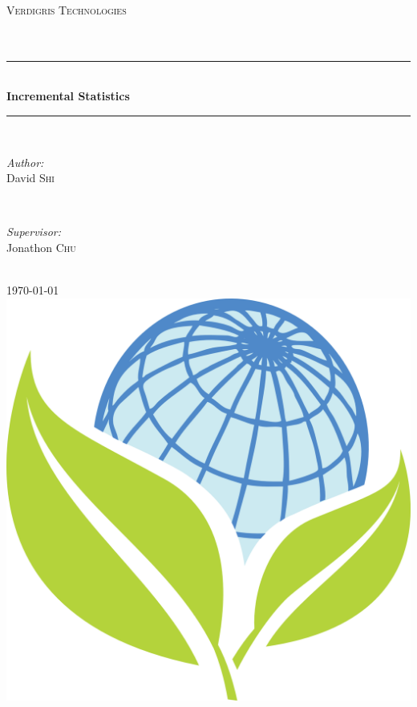 \documentclass[english,12pt]{article}
\theoremstyle{plain}
\theoremstyle{definition}
\theoremstyle{definition} %
\begin{document}
\begin{titlepage}

\newcommand{\HRule}{\rule{\linewidth}{0.5mm}} %

\center %

\textsc{\LARGE Verdigris Technologies}\\[1.5cm] %
\textsc{\Large }\\[0.5cm] %
\textsc{\large }\\[0.5cm] %

\HRule \\[0.4cm]
{ \huge \bfseries Incremental Statistics}\\[0.4cm] %
\HRule \\[1.5cm]

\begin{minipage}{0.4\textwidth}
\begin{flushleft} \large
\emph{Author:}\\
David \textsc{Shi} %
\end{flushleft}
\end{minipage}
~
\begin{minipage}{0.4\textwidth}
\begin{flushright} \large
\emph{Supervisor:} \\
Jonathon \textsc{Chu} %
\end{flushright}
\end{minipage}\\[4cm]

{\large \today}\\[1cm] %
\includegraphics[scale = 0.2]{logo.png}\\[1cm] %


\end{titlepage}
\end{document}
